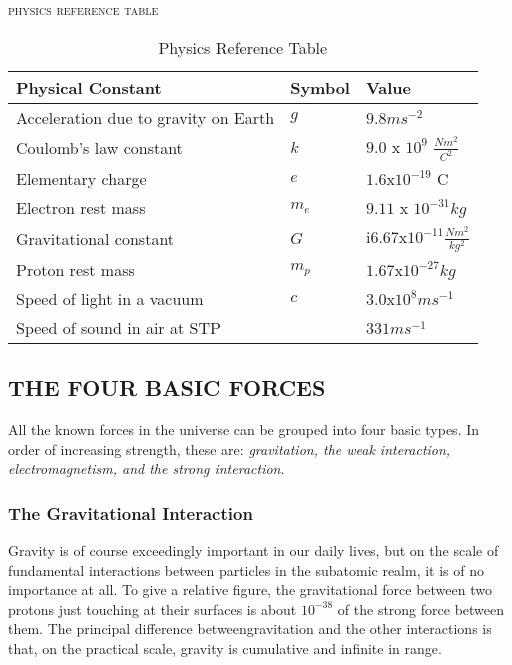 \documentclass[12pt, a4paper]{article}
\newcommand\textlcsc[1]{\textsc{\MakeLowercase{#1}}} %
\begin{document}
\begin{table}
\begin{tcolorbox}

\center
\huge
\textlcsc{Physics Reference Table}\\
\end{tcolorbox}
\noindent
\begin{tabu} to 1.0\textwidth { | X[l] | X[c] | X[r] | }
 \hline
 \textbf{Physical Constant} & \textbf{Symbol} & \textbf{Value} \\
 \hline
 Acceleration due to gravity on
Earth  & $g$  & $9.8 ms^{-2}$  \\ 
 \hline
 Coulomb’s law constant   & $k$  & $9.0 $ x $10^9 $ $\frac{Nm^2}{C^2}$  \\
  \hline
 Elementary charge   & $e$  & $1.6$x$10^{-19}$  C\\
  \hline
 Electron rest mass   & $m_e$  & $9.11$ x $10^{-31}kg$   \\
  \hline
 Gravitational constant   & $G$  & i$6.67$x$10^{-11}\frac{Nm^2}{kg^2}$  \\
  \hline
 Proton rest mass   & $m_p$  & $1.67$x$10^{-27}kg$  \\
  \hline
 Speed of light in a vacuum  & $c$  & $3.0$x$10^8 ms^{-1}$  \\
  \hline
 Speed of sound in air at STP  &   & $331 ms^{-1}$  \\
  \hline

\end{tabu}
\caption{\label{tab:table-name}Physics Reference Table}
\end{table}


\break




\subsection*{THE FOUR BASIC FORCES} 
All the known forces in the universe can be grouped into four basic types.
In order of increasing strength, these are: \emph {gravitation, the weak interaction,
electromagnetism, and the strong interaction}.

\subsubsection*{The Gravitational Interaction}  
Gravity is of course exceedingly important in our daily lives, but on the scale of fundamental interactions between particles
in the subatomic realm, it is of no importance at all. To give a relative figure,
the gravitational force between two protons just touching at their surfaces is
about $10^{-38}$ of the strong force between them. The principal difference betweengravitation and the other interactions is that, on the practical scale, gravity is cumulative and infinite in range. 
\end{document}
